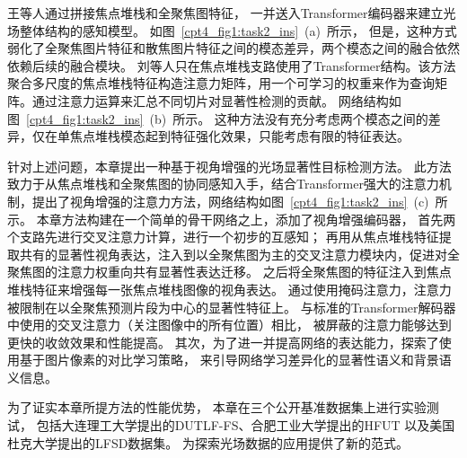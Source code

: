 王等人通过拼接焦点堆栈和全聚焦图特征，
一并送入Transformer编码器来建立光场整体结构的感知模型。
如图~\ref{cpt4_fig1:task2_ins}~(a)~所示，
但是，这种方式弱化了全聚焦图片特征和散焦图片特征之间的模态差异，两个模态之间的融合依然依赖后续的融合模块。
刘等人只在焦点堆栈支路使用了Transformer结构。该方法聚合多尺度的焦点堆栈特征构造注意力矩阵，用一个可学习的权重来作为查询矩阵。通过注意力运算来汇总不同切片对显著性检测的贡献。
网络结构如图~\ref{cpt4_fig1:task2_ins}~(b)~所示。
这种方法没有充分考虑两个模态之间的差异，仅在单焦点堆栈模态起到特征强化效果，只能考虑有限的特征表达。
% 
% 
% 
% 
\par
%
%
针对上述问题，本章提出一种基于视角增强的光场显著性目标检测方法。
此方法致力于从焦点堆栈和全聚焦图的协同感知入手，结合Transformer强大的注意力机制，提出了视角增强的注意力方法，网络结构如图~\ref{cpt4_fig1:task2_ins}~(c)~所示。
本章方法构建在一个简单的骨干网络之上，添加了视角增强编码器，
首先两个支路先进行交叉注意力计算，进行一个初步的互感知；
再用从焦点堆栈特征提取共有的显著性视角表达，注入到以全聚焦图为主的交叉注意力模块内，促进对全聚焦图的注意力权重向共有显著性表达迁移。
之后将全聚焦图的特征注入到焦点堆栈特征来增强每一张焦点堆栈图像的视角表达。
通过使用掩码注意力，注意力被限制在以全聚焦预测片段为中心的显著性特征上。
与标准的Transformer解码器中使用的交叉注意力（关注图像中的所有位置）相比，
被屏蔽的注意力能够达到更快的收敛效果和性能提高。
其次，为了进一并提高网络的表达能力，探索了使用基于图片像素的对比学习策略，
来引导网络学习差异化的显著性语义和背景语义信息。










为了证实本章所提方法的性能优势，
本章在三个公开基准数据集上进行实验测试，
包括大连理工大学提出的DUTLF-FS、合肥工业大学提出的HFUT
以及美国杜克大学提出的LFSD数据集。
为探索光场数据的应用提供了新的范式。












% 
% 
% 
% 







